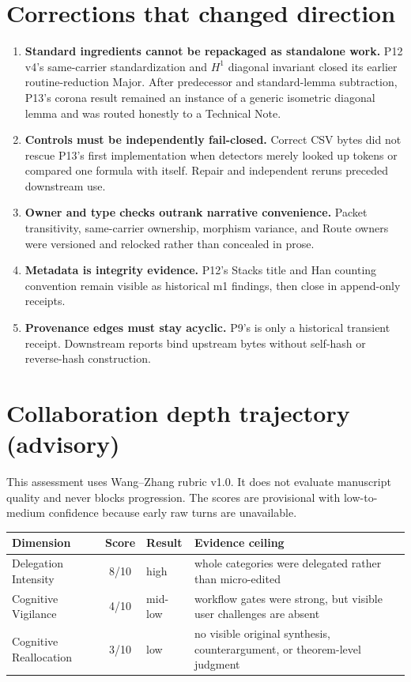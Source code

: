 \documentclass[11pt,a4paper]{article}
\newcommand{\code}[1]{\texttt{\detokenize{#1}}}
\begin{document}
\section{Corrections that changed direction}

\begin{enumerate}
  \item \textbf{Standard ingredients cannot be repackaged as standalone work.}
  P12 v4's same-carrier standardization and \(H^1\) diagonal invariant closed
  its earlier routine-reduction Major. After predecessor and standard-lemma
  subtraction, P13's corona result remained an instance of a generic isometric
  diagonal lemma and was routed honestly to a Technical Note.
  \item \textbf{Controls must be independently fail-closed.} Correct CSV bytes
  did not rescue P13's first implementation when detectors merely looked up
  tokens or compared one formula with itself. Repair and independent reruns
  preceded downstream use.
  \item \textbf{Owner and type checks outrank narrative convenience.} Packet
  transitivity, same-carrier ownership, morphism variance, and Route owners were
  versioned and relocked rather than concealed in prose.
  \item \textbf{Metadata is integrity evidence.} P12's Stacks title and Han
  counting convention remain visible as historical m1 findings, then close in
  append-only receipts.
  \item \textbf{Provenance edges must stay acyclic.} P9's \code{paper.log} is
  only a historical transient receipt. Downstream reports bind upstream bytes
  without self-hash or reverse-hash construction.
\end{enumerate}

\section{Collaboration depth trajectory (advisory)}

This assessment uses Wang--Zhang rubric v1.0. It does not evaluate manuscript
quality and never blocks progression. The scores are provisional with
low-to-medium confidence because early raw turns are unavailable.

\begin{table}[htbp]
\centering\small
\begin{tabularx}{\textwidth}{@{}lclY@{}}
\toprule
Dimension & Score & Result & Evidence ceiling\\
\midrule
Delegation Intensity & 8/10 & high & whole categories were delegated rather than micro-edited\\
Cognitive Vigilance & 4/10 & mid-low & workflow gates were strong, but visible user challenges are absent\\
Cognitive Reallocation & 3/10 & low & no visible original synthesis, counterargument, or theorem-level judgment\\
\bottomrule
\end{tabularx}
\end{table}
\end{document}
